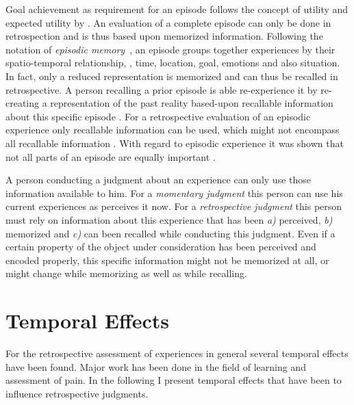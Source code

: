 Goal achievement as requirement for an episode follows the concept of utility and expected utility by \citet{kahneman_experienced_2000}.
An evaluation of a complete episode can only be done in retrospection and is thus based upon memorized information.
Following the notation of \emph{episodic memory}~\citet{tulving_episodic_1972}, an episode groups together experiences by their spatio-temporal relationship, \ie, time, location, goal, emotions and also situation.
In fact, only a reduced representation is memorized and can thus be recalled in retrospective.
A person recalling a prior episode is able re-experience it by re-creating a representation of the past reality based-upon recallable information about this specific episode \citep{tulving_episodic_1972}.
For a retrospective evaluation of an episodic experience only recallable information can be used, which might not encompass all recallable information \citep{schacter_seven_2003}.
With regard to episodic experience it was shown that not all parts of an episode are equally important \citep{kahneman_experienced_2000,ariely_combining_1998}.





A person conducting a judgment about an experience can only use those information available to him.
For a \emph{momentary judgment} this person can use his current experiences as perceives it now.
For a \emph{retrospective judgment} this person must rely on information about this experience that has been \emph{a)} perceived, \emph{b)} memorized and \emph{c)} can been recalled while conducting this judgment.
Even if a certain property of the object under consideration has been perceived and encoded properly, this specific information might not be memorized at all, or might change while memorizing as well as while recalling.


\section{Temporal Effects}

For the retrospective assessment of experiences in general several temporal effects have been found.
Major work has been done in the field of learning and assessment of pain.
In the following I present temporal effects that have been to influence retrospective judgments.

